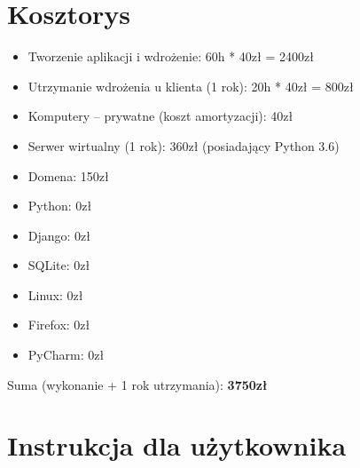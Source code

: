 \documentclass[12pt]{article}
\begin{document}
	\section{Kosztorys}
	\begin{itemize}
		\item Tworzenie aplikacji i wdrożenie: 60h * 40zł = 2400zł
		\item Utrzymanie wdrożenia u klienta (1 rok): 20h * 40zł = 800zł
		\item Komputery – prywatne (koszt amortyzacji): 40zł
		\item Serwer wirtualny (1 rok): 360zł (posiadający Python 3.6)
		\item Domena: 150zł
		\item Python: 0zł
		\item Django: 0zł
		\item SQLite: 0zł
		\item Linux: 0zł
		\item Firefox: 0zł
		\item PyCharm: 0zł
	\end{itemize}
	Suma (wykonanie + 1 rok utrzymania):\textbf{ 3750zł }
	\newpage
	\section{Instrukcja dla użytkownika}
\end{document}
